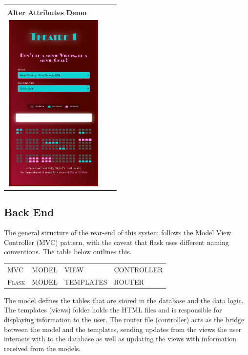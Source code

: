 \documentclass[11pt, english]{article}
\begin{document}
\begin{center}
\begin{longtable}{p{5cm}p{5cm}p{5cm}}
		& \\
                \textbf{Alter Attributes Demo}\\
		\includegraphics[width=5cm,height=9cm]{CS993_IMG/booker4.png}\\
        \end{longtable}
        \end{center}

	\subsection{Back End}

	The general structure of the rear-end of this system follows the Model View Controller (MVC) pattern, with the caveat that flask uses different naming conventions. The table below outlines this.\\

	\begin{center}
	\begin{tabular}{p{2cm}|p{2cm}p{2.5cm}p{2cm}}
		\textsc{MVC} & MODEL & VIEW & CONTROLLER\\
		\textsc{Flask} & MODEL & TEMPLATES & ROUTER\\
	\end{tabular}
	\end{center}

	The model defines the tables that are stored in the database and the data logic. The templates (views) folder holds the HTML files and is responsible for displaying information to the user. The router file (controller) acts as the bridge between the model and the templates, sending updates from the views the user interacts with to the database as well as updating the views with information received from the models.\\
\end{document}
